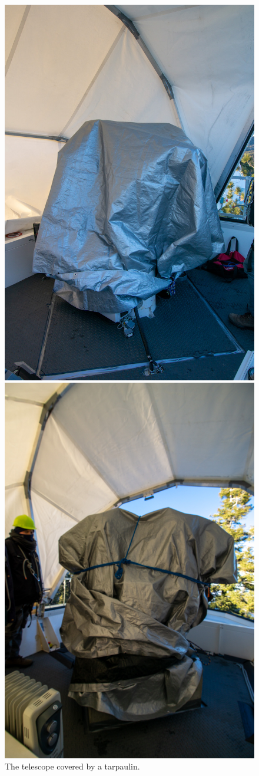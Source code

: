 \begin{enumerate}
\begin{figure}
\ifcoatli
\begin{center}
\includegraphics[width=0.65\linewidth]{figures/tarpaulin-coatli.jpg}
\end{center}
\caption{The telescope covered by a tarpaulin.}
\fi
\ifddoti
\begin{center}
\includegraphics[width=0.45\linewidth]{figures/tarpaulin-ddoti.jpg}

\end{center}
\end{figure}
\end{enumerate}
